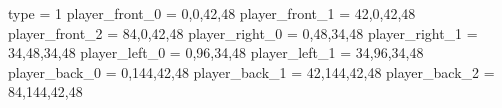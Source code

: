 type = 1
player_front_0 = 0,0,42,48
player_front_1 = 42,0,42,48
player_front_2 = 84,0,42,48
player_right_0 = 0,48,34,48
player_right_1 = 34,48,34,48
player_left_0 = 0,96,34,48
player_left_1 = 34,96,34,48
player_back_0 = 0,144,42,48
player_back_1 = 42,144,42,48
player_back_2 = 84,144,42,48